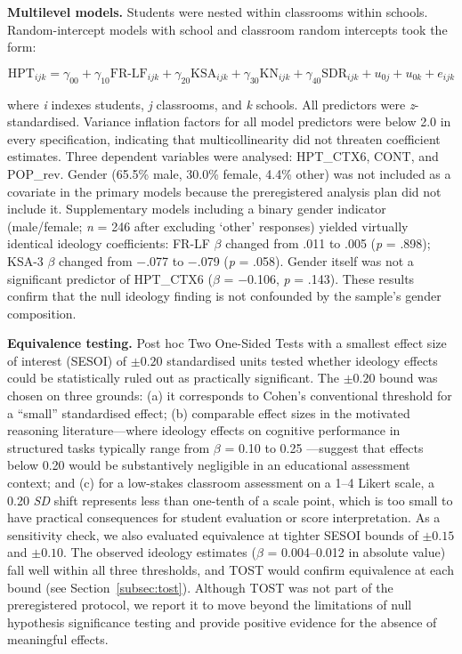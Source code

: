 \documentclass[referee,pdflatex,sn-apa]{sn-jnl}
\begin{document}
\textbf{Multilevel models.} Students were nested within classrooms within schools. Random-intercept models with school and classroom random intercepts took the form:

\begin{equation}\label{eq:mlm}
\text{HPT}_{ijk} = \gamma_{00} + \gamma_{10}\text{FR-LF}_{ijk} + \gamma_{20}\text{KSA}_{ijk} + \gamma_{30}\text{KN}_{ijk} + \gamma_{40}\text{SDR}_{ijk} + u_{0j} + u_{0k} + e_{ijk}
\end{equation}

where \textit{i} indexes students, \textit{j} classrooms, and \textit{k} schools. All predictors were \textit{z}-standardised. Variance inflation factors for all model predictors were below 2.0 in every specification, indicating that multicollinearity did not threaten coefficient estimates. Three dependent variables were analysed: HPT\_CTX6, CONT, and POP\_rev. Gender (65.5\% male, 30.0\% female, 4.4\% other) was not included as a covariate in the primary models because the preregistered analysis plan did not include it. Supplementary models including a binary gender indicator (male/female; \textit{n} = 246 after excluding `other' responses) yielded virtually identical ideology coefficients: FR-LF $\beta$ changed from .011 to .005 (\textit{p} = .898); KSA-3 $\beta$ changed from $-$.077 to $-$.079 (\textit{p} = .058). Gender itself was not a significant predictor of HPT\_CTX6 ($\beta$ = $-$0.106, \textit{p} = .143). These results confirm that the null ideology finding is not confounded by the sample's gender composition.

\textbf{Equivalence testing.} Post hoc Two One-Sided Tests \citep[TOST;][]{Lakens2017} with a smallest effect size of interest (SESOI) of $\pm 0.20$ standardised units tested whether ideology effects could be statistically ruled out as practically significant. The $\pm 0.20$ bound was chosen on three grounds: (a) it corresponds to Cohen's conventional threshold for a ``small'' standardised effect; (b) comparable effect sizes in the motivated reasoning literature---where ideology effects on cognitive performance in structured tasks typically range from $\beta$ = 0.10 to 0.25 \citep{Kahan2017}---suggest that effects below 0.20 would be substantively negligible in an educational assessment context; and (c) for a low-stakes classroom assessment on a 1--4 Likert scale, a 0.20 \textit{SD} shift represents less than one-tenth of a scale point, which is too small to have practical consequences for student evaluation or score interpretation. As a sensitivity check, we also evaluated equivalence at tighter SESOI bounds of $\pm 0.15$ and $\pm 0.10$. The observed ideology estimates ($\beta$ = 0.004--0.012 in absolute value) fall well within all three thresholds, and TOST would confirm equivalence at each bound (see Section~\ref{subsec:tost}). Although TOST was not part of the preregistered protocol, we report it to move beyond the limitations of null hypothesis significance testing and provide positive evidence for the absence of meaningful effects.
\end{document}
